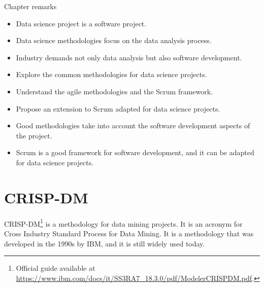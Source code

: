 \begin{mainbox}{Chapter remarks}


  \startcontents[chapters]
  \vspace{1em}


  \begin{itemize}
    \itemsep0em
    \item Data science project is a software project.
    \item Data science methodologies focus on the data analysis process.
    \item Industry demands not only data analysis but also software development.
  \end{itemize}


  \begin{itemize}
    \itemsep0em
    \item Explore the common methodologies for data science projects.
    \item Understand the agile methodologies and the Scrum framework.
    \item Propose an extension to Scrum adapted for data science projects.
  \end{itemize}


  \begin{itemize}
    \itemsep0em
    \item Good methodologies take into account the software development aspects of the
      project.
    \item Scrum is a good framework for software development, and it can be adapted for
      data science projects.
  \end{itemize}
\end{mainbox}

{}
\clearpage

\section{CRISP-DM}

CRISP-DM\footnote{Official guide available at
\url{https://www.ibm.com/docs/it/SS3RA7_18.3.0/pdf/ModelerCRISPDM.pdf}.} is a methodology
for data mining projects.  It is an acronym for Cross Industry Standard Process for Data
Mining.  It is a methodology that was developed in the 1990s by IBM, and it is still
widely used today.

